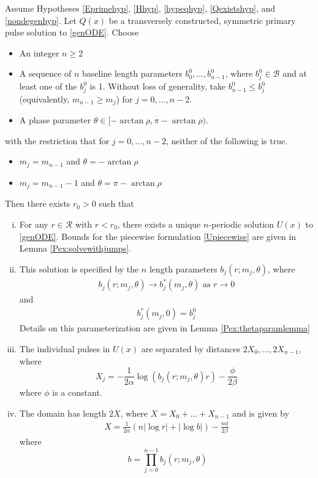 \documentclass[thesis.tex]{subfiles}
\begin{document}
\begin{theorem}\label{perexist}
Assume Hypotheses \ref{Eprimehyp}, \ref{Hhyp}, \ref{hypeqhyp}, \ref{Qexistshyp}, and \ref{nondegenhyp}. Let $Q(x)$ be a transversely constructed, symmetric primary pulse solution to \eqref{genODE}. Choose
\begin{itemize}
\item An integer $n \geq 2$ 
\item A sequence of $n$ baseline length parameters $b_0^0, \dots, b_{n-1}^0$, where $b_j^0 \in \mathcal{B}$ and at least one of the $b_j^0$ is 1. Without loss of generality, take $b_{n-1}^0 \leq b_j^0$ (equivalently, $m_{n-1} \geq m_j$) for $j = 0, \dots, n-2$.
\item A phase parameter $\theta \in [-\arctan \rho, \pi - \arctan \rho)$.
\end{itemize}
with the restriction that for $j = 0, \dots, n-2$, neither of the following is true.
\begin{itemize}
\item $m_j = m_{n-1}$ and $\theta = -\arctan \rho$
\item $m_j = m_{n-1} - 1$ and $\theta = \pi-\arctan \rho$
\end{itemize}
Then there exists $r_0 > 0$ such that
\begin{enumerate}[(i)]

\item For any $r \in \mathcal{R}$ with $r < r_0$, there exists a unique $n$-periodic solution $U(x)$ to \eqref{genODE}. Bounds for the piecewise formulation \eqref{Upiecewise} are given in Lemma \ref{Pex:solvewithjumps}.

\item This solution is specified by the $n$ length parameters $b_j(r; m_j, \theta)$, where
\begin{align}
b_j(r; m_j, \theta) \rightarrow b^*_j(m_j, \theta) \text{ as } r \rightarrow 0
\end{align}
and
\begin{align}
b^*_j(m_j, 0) = b_j^0
\end{align}
Details on this parameterization are given in Lemma \ref{Pex:thetaparamlemma}

\item The individual pulses in $U(x)$ are separated by distances $2 X_0, \dots, 2 X_{n-1}$, where 
\begin{equation}\label{Xj}
X_j = -\frac{1}{2\alpha}\log(b_j(r; m_j, \theta) r) - \frac{\phi}{2 \beta} 
\end{equation}
where $\phi$ is a constant.

\item The domain has length $2X$, where $X = X_0 + \dots + X_{n-1}$ and is given by
\begin{align}
X = \frac{1}{2\alpha} (n |\log r| + |\log b| ) - \frac{n \phi}{2 \beta}
\end{align}
where 
\begin{equation}\
b = \prod_{j=0}^{n-1} b_j(r; m_j, \theta)
\end{equation}
\end{enumerate}
\end{theorem}
\end{document}
